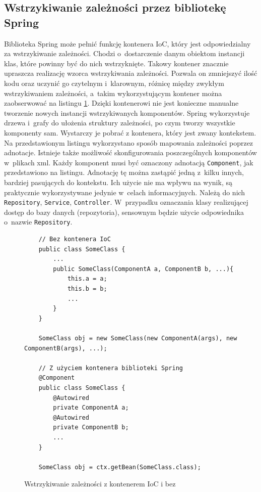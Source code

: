 \documentclass[a4paper]{book}
\begin{document}
{\subsection{Wstrzykiwanie zależności przez bibliotekę Spring}

Biblioteka Spring może pełnić funkcję kontenera IoC, który jest odpowiedzialny za wstrzykiwanie zależności. Chodzi o~dostarczenie danym obiektom instancji klas, które powinny być do nich wstrzyknięte. Takowy kontener znacznie upraszcza realizację wzorca wstrzykiwania zależności. Pozwala on zmniejszyć ilość kodu oraz uczynić go czytelnym i~klarownym, różnicę między zwykłym wstrzykiwaniem zależności, a~takim wykorzystującym kontener można zaobserwować na listingu \ref{id:fig:listing:DiWithAndWithoutIoC}. Dzięki kontenerowi nie jest konieczne manualne tworzenie nowych instancji wstrzykiwanych komponentów. Spring wykorzystuje drzewa i~grafy do ułożenia struktury zależności, po czym tworzy wszystkie komponenty sam. Wystarczy je pobrać z kontenera, który jest zwany kontekstem. Na przedstawionym listingu wykorzystano sposób mapowania zależności poprzez adnotacje. Istnieje także możliwość skonfigurowania poszczególnych komponentów w~plikach xml. Każdy komponent musi być oznaczony adnotacją \lstinline|Component|, jak przedstawiono na listingu. Adnotację tę można zastąpić jedną z~kilku innych, bardziej pasujących do kontekstu. Ich użycie nie ma wpływu na wynik, są praktycznie wykorzystywane jedynie w~celach informacyjnych. Należą do nich \lstinline|Repository|, \lstinline|Service|, \lstinline|Controller|. W~przypadku oznaczania klasy realizującej dostęp do bazy danych (repozytoria), sensownym będzie użycie odpowiednika o~nazwie \lstinline|Repository|.
\begin{figure}
\begin{lstlisting}
	// Bez kontenera IoC
	public class SomeClass {
		... 
		public SomeClass(ComponentA a, ComponentB b, ...){
			this.a = a;
			this.b = b;
			...
		}
	}
	
	SomeClass obj = new SomeClass(new ComponentA(args), new ComponentB(args), ...);
	
	// Z użyciem kontenera biblioteki Spring
	@Component
	public class SomeClass {
		@Autowired
		private ComponentA a;
		@Autowired
		private ComponentB b;
		...
	}
	
	SomeClass obj = ctx.getBean(SomeClass.class);
\end{lstlisting}
\caption{Wstrzykiwanie zależności z kontenerem IoC i bez}
\label{id:fig:listing:DiWithAndWithoutIoC}
\end{figure}

}
\end{document}
